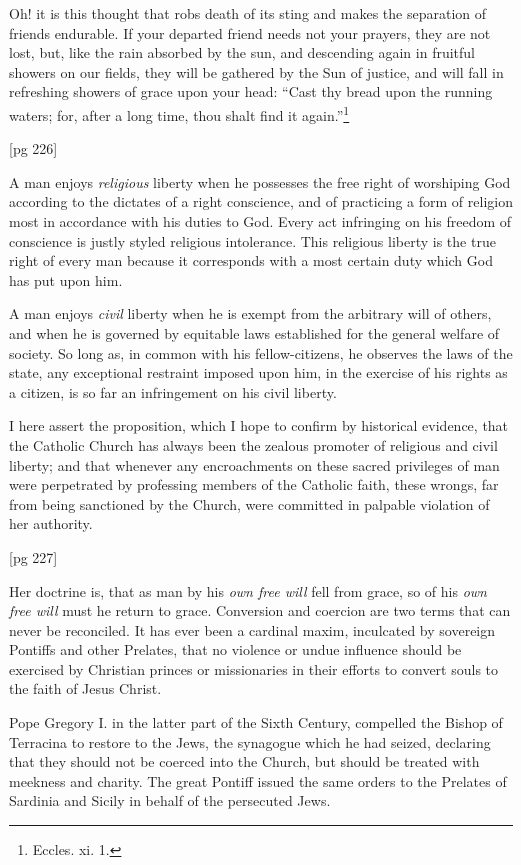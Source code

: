 Oh! it is this thought that robs death of its
sting and makes the separation of friends endurable.
If your departed friend needs not your
prayers, they are not lost, but, like the rain absorbed
by the sun, and descending again in fruitful
showers on our fields, they will be gathered
by the Sun of justice, and will fall in refreshing
showers of grace upon your head: “Cast thy
bread upon the running waters; for, after a long
time, thou shalt find it again.”\footnote{Eccles. xi. 1.}

[pg 226]


A man enjoys \emph{religious} liberty when he possesses
the free right of worshiping God according
to the dictates of a right conscience,
and of practicing a form of religion most in accordance
with his duties to God. Every act infringing
on his freedom of conscience is justly
styled religious intolerance. This religious liberty
is the true right of every man because it corresponds
with a most certain duty which God has
put upon him.

A man enjoys \emph{civil} liberty when he is exempt
from the arbitrary will of others, and when he is
governed by equitable laws established for the
general welfare of society. So long as, in common
with his fellow-citizens, he observes the laws
of the state, any exceptional restraint imposed
upon him, in the exercise of his rights as a citizen,
is so far an infringement on his civil liberty.

I here assert the proposition, which I hope to
confirm by historical evidence, that the Catholic
Church has always been the zealous promoter of
religious and civil liberty; and that whenever any
encroachments on these sacred privileges of man
were perpetrated by professing members of the
Catholic faith, these wrongs, far from being sanctioned
by the Church, were committed in palpable
violation of her authority.

[pg 227]

Her doctrine is, that as man by his \emph{own free will}
fell from grace, so of his \emph{own free will} must he
return to grace. Conversion and coercion are two
terms that can never be reconciled. It has ever
been a cardinal maxim, inculcated by sovereign
Pontiffs and other Prelates, that no violence or undue
influence should be exercised by Christian
princes or missionaries in their efforts to convert
souls to the faith of Jesus Christ.

Pope Gregory I. in the latter part of the Sixth
Century, compelled the Bishop of Terracina to restore
to the Jews, the synagogue which he had
seized, declaring that they should not be coerced
into the Church, but should be treated with meekness
and charity. The great Pontiff issued the
same orders to the Prelates of Sardinia and Sicily
in behalf of the persecuted Jews.

